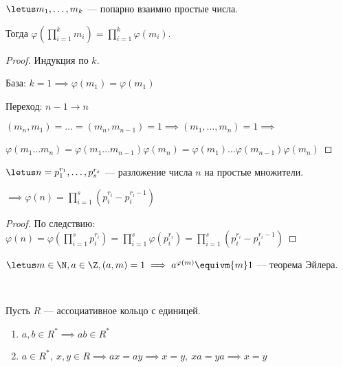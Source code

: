 \begin{follow}
    $\letus m_1, \ldots, m_k$ --- попарно взаимно простые числа.

    Тогда $\varphi(\prod\limits_{i=1}^k m_i) = \prod\limits_{i=1}^k \varphi(m_i)$.
\end{follow}

\begin{proof}
    Индукция по $k$.

    База: $k = 1 \implies \varphi(m_1) = \varphi(m_1)$
    
    Переход: $n-1 \to n$
    
    $(m_n, m_1) = \ldots = (m_n, m_{n-1}) = 1 \implies (m_1, \ldots, m_n) = 1 \implies$
    
    $\varphi(m_1 \ldots m_n) = \varphi(m_1 \ldots m_{n-1}) \varphi(m_n) = \varphi(m_1) \ldots \varphi(m_{n-1}) \varphi(m_n)$
\end{proof}

\begin{follow}
    $\letus n = p_1^{r_1}, \ldots, p_s^{r_s}$ --- разложение числа $n$ на простые множители.
    
    $\implies \varphi(n) = \prod\limits_{i=1}^s (p_i^{r_i} - p_i^{r_i-1})$
\end{follow}

\begin{proof}
    По следствию: $\varphi(n) = \varphi(\prod\limits_{i=1}^s p_i^{r_i}) = \prod\limits_{i=1}^s \varphi(p_i^{r_i}) = \prod\limits_{i=1}^s (p_i^{r_i} - p_i^{r_i-1})$
\end{proof}

\begin{theorem}
    $\letus m \in \N, a \in \Z, (a, m) = 1 \implies a^{\varphi(m)} \equivm{m} 1$ --- теорема Эйлера.
\end{theorem}

\begin{lemma}~

    Пусть $R$ --- ассоциативное кольцо с единицей.
    \begin{enumerate}
        \item $a, b \in R^* \implies ab \in R^*$
        
        \item $a \in R^*,~x,y \in R \implies ax = ay \implies x = y,~xa = ya \implies x = y$
    \end{enumerate}
\end{lemma}

